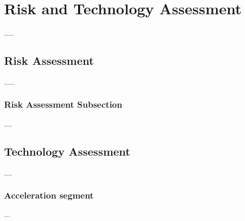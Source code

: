 \chapter{Risk and Technology Assessment}
\label{chap:risks}
.....

 
\section{Risk Assessment}
.....
\subsection{Risk Assessment Subsection}
....

\section{Technology Assessment}
....
\subsection{Acceleration segment}
...